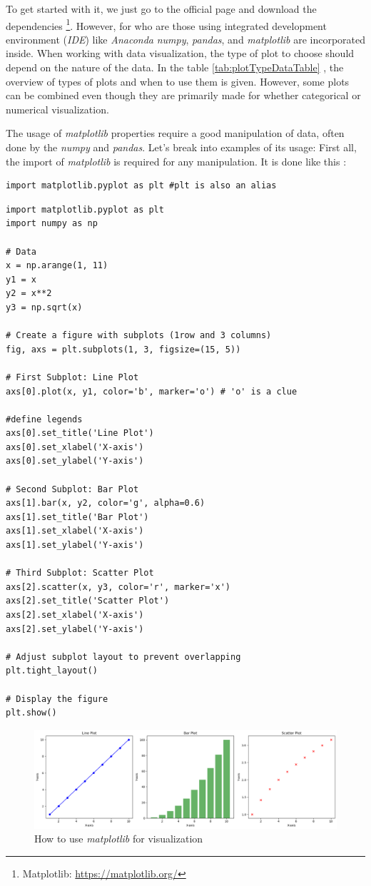 \documentclass[12pt,a4paper, oneside]{book}
\begin{document}
To get started with it, we just go to the official page and download the dependencies \footnote{Matplotlib: \url{https://matplotlib.org/}}. However, for who are those using integrated development environment (\textit{IDE}) like \textit{Anaconda} \textit{numpy}, \textit{pandas}, and \textit{matplotlib} are incorporated inside.
When working with data visualization, the type of plot to choose should depend on the nature of the data. In the table \ref{tab:plotTypeDataTable} , the overview of types of plots and when to use them is given. However, some plots can be combined even though they are primarily made for whether categorical or numerical visualization. 

\noindent The usage of \textit{matplotlib} properties require a good manipulation of data, often done by the \textit{numpy} and \textit{pandas}. Let's break into examples of its usage: \newline
First all, the import of \textit{matplotlib} is required for any manipulation. It is done like this :
\begin{lstlisting}[style=stylejupyter]
import matplotlib.pyplot as plt #plt is also an alias
\end{lstlisting} 
 
\begin{lstlisting}[style=stylejupyter]
import matplotlib.pyplot as plt
import numpy as np

# Data
x = np.arange(1, 11)
y1 = x
y2 = x**2
y3 = np.sqrt(x)

# Create a figure with subplots (1row and 3 columns)
fig, axs = plt.subplots(1, 3, figsize=(15, 5))

# First Subplot: Line Plot   
axs[0].plot(x, y1, color='b', marker='o') # 'o' is a clue

#define legends
axs[0].set_title('Line Plot')
axs[0].set_xlabel('X-axis')
axs[0].set_ylabel('Y-axis')

# Second Subplot: Bar Plot
axs[1].bar(x, y2, color='g', alpha=0.6)
axs[1].set_title('Bar Plot')
axs[1].set_xlabel('X-axis')
axs[1].set_ylabel('Y-axis')

# Third Subplot: Scatter Plot 
axs[2].scatter(x, y3, color='r', marker='x')
axs[2].set_title('Scatter Plot')
axs[2].set_xlabel('X-axis')
axs[2].set_ylabel('Y-axis')

# Adjust subplot layout to prevent overlapping
plt.tight_layout()

# Display the figure
plt.show()
\end{lstlisting}  

\begin{figure}
	\centering
	\includegraphics[width=1\linewidth]{matplotLibExample}
	\caption{How to use \textit{matplotlib} for visualization}
	\label{fig:matplotlibexample}
\end{figure} 
\end{document}
